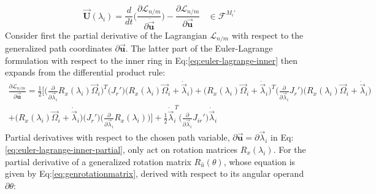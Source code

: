 \begin{equation}\label{eq:euler-lagrange-inner}
\vec{\mathbf{U}}(\lambda_i)=\frac{d}{dt}\bigg(\frac{\partial \mathcal{L}_{n/m}}{\partial \dot{\vec{\mathbf{u}}}}\bigg)-\frac{\partial \mathcal{L}_{n/m}}{\partial \vec{\mathbf{u}}}~~~~\in\mathcal{F}^{M_i'}
\end{equation}
Consider first the partial derivative of the Lagrangian $\mathcal{L}_{n/m}$ with respect to the generalized path coordinates $\partial\vec{\mathbf{u}}$. The latter part of the Euler-Lagrange formulation with respect to the inner ring in Eq:\ref{eq:euler-lagrange-inner} then expands from the differential product rule:
\begin{multline}\label{eq:euler-lagrange-inner-partial}
\frac{\partial\mathcal{L}_{n/m}}{\partial\vec{\mathbf{u}}}=\frac{1}{2}\Bigg[\bigg(\frac{\partial}{\partial\vec{\lambda}_i}R_x(\lambda_i)\vec{\Omega}_i\bigg)^T\big(J_r'\big)\Big(R_x(\lambda_i)\vec{\Omega}_i+\dot{\vec{\lambda}}_i\Big)+\Big(R_x(\lambda_i)\vec{\Omega}_i+\dot{\vec{\lambda}}_i\Big)^T\bigg(\frac{\partial}{\partial\vec{\lambda}_i}J_r'\bigg)\Big(R_x(\lambda_i)\vec{\Omega}_i+\dot{\vec{\lambda}}_i\Big)
\\
+\Big(R_x(\lambda_i)\vec{\Omega}_i+\dot{\vec{\lambda}}_i\Big)\big(J_r'\big)\bigg(\frac{\partial}{\partial\vec{\lambda}_i}R_x(\lambda_i)\bigg)\Bigg]+\frac{1}{2}\dot{\vec{\lambda}}_i^{\hspace{2pt}T}\bigg(\frac{\partial}{\partial\vec{\lambda}_i}J_{ir}'\bigg)\dot{\vec{\lambda}}_i
\end{multline}
Partial derivatives with respect to the chosen path variable, $\partial\vec{\mathbf{u}}=\partial\vec{\lambda}_i$ in Eq:\ref{eq:euler-lagrange-inner-partial}, only act on rotation matrices $R_x(\lambda_i)$. For the partial derivative of a generalized rotation matrix $R_{\hat{u}}(\theta)$, whose equation is given by Eq:\ref{eq:genrotationmatrix}, derived with respect to its angular operand $\partial\theta$:
